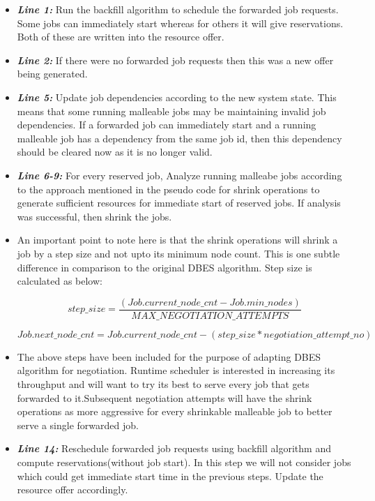 \begin{itemize}
\item \textbf{\textit{Line 1:}} Run the backfill algorithm to schedule the forwarded job requests. Some jobs can immediately start whereas for others it will give reservations. Both of these are written into the resource offer.
\item \textbf{\textit{Line 2:}} If there were no forwarded job requests then this was a new offer being generated.
\item \textbf{\textit{Line 5:}} Update job dependencies according to the new system state. This means that some running malleable jobs may be maintaining invalid job dependencies. If a forwarded job can immediately start and a running malleable job has a dependency from the same job id, then this dependency should be cleared now as it is no longer valid. 
\item \textbf{\textit{Line 6-9:}} For every reserved job, Analyze running malleabe jobs according to the approach mentioned in the pseudo code for shrink operations to generate sufficient resources for immediate start of reserved jobs. If analysis was successful, then shrink the jobs.
\item An important point to note here is that the shrink operations will shrink a job by a step size and not upto its minimum node count. This is one subtle difference in comparison to the original DBES algorithm. Step size is calculated as below:
\vspace{-0.30in}
\begin{center}
\boldmath\begin{equation*}
step\_size = \frac{(Job.current\_node\_cnt - Job.min\_nodes)}{MAX\_NEGOTIATION\_ATTEMPTS}
\end{equation*}
\end{center}
\vspace{-0.30in}
\begin{center}
\boldmath\begin{equation*}
Job.next\_node\_cnt = Job.current\_node\_cnt - (step\_size * negotiation\_attempt\_no)
\end{equation*}
\end{center}
\item The above steps have been included for the purpose of adapting DBES algorithm for negotiation. Runtime scheduler is interested in increasing its throughput and will want to try its best to serve every job that gets forwarded to it.Subsequent negotiation attempts will have the shrink operations as more aggressive for every shrinkable malleable job to better serve a single forwarded job.
\item \textbf{\textit{Line 14:}} Reschedule forwarded job requests using backfill algorithm and compute reservations(without job start). In this step we will not consider jobs which could get immediate start time in the previous steps. Update the resource offer accordingly.
\end{itemize}
